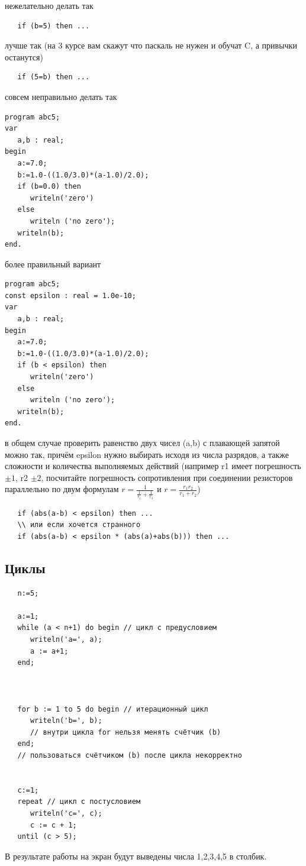 \documentclass[unicode, 12pt, a4paper,oneside,fleqn]{article}
\begin{document}
{\tiny
нежелательно делать так
\begin{verbatim}
   if (b=5) then ...
\end{verbatim}
лучше так (на 3 курсе вам скажут что паскаль
  не нужен и обучат C, а привычки останутся)
\begin{verbatim}
   if (5=b) then ...
\end{verbatim}


совсем неправильно делать так
\begin{verbatim}
program abc5;
var 
   a,b : real;
begin
   a:=7.0;
   b:=1.0-((1.0/3.0)*(a-1.0)/2.0); 
   if (b=0.0) then
      writeln('zero')
   else
      writeln ('no zero');
   writeln(b);
end.
\end{verbatim}

более правильный вариант
\begin{verbatim}
program abc5;
const epsilon : real = 1.0e-10;
var 
   a,b : real;
begin
   a:=7.0;
   b:=1.0-((1.0/3.0)*(a-1.0)/2.0); 
   if (b < epsilon) then
      writeln('zero')
   else
      writeln ('no zero');
   writeln(b);
end.
\end{verbatim}

в общем случае проверить равенство двух чисел (a,b) с плавающей
запятой можно так, причём epsilon нужно выбирать исходя из числа
разрядов, а также сложности и количества выполняемых действий
(например r1 имеет погрешность $\pm1$\textohm,  r2 $\pm2$\textohm, посчитайте
погрешность сопротивления при соединении резисторов параллельно по двум формулам
$r=\frac{1}{\frac{1}{r_1} + \frac{1}{r_2}}$ и $r=\frac{r_1r_2}{r_1 + r_2}$)

\begin{verbatim}
   if (abs(a-b) < epsilon) then ...
   \\ или если хочется странного
   if (abs(a-b) < epsilon * (abs(a)+abs(b))) then ...
\end{verbatim}
}

\subsection{Циклы}
\begin{verbatim}
   n:=5;
   
   a:=1;
   while (a < n+1) do begin // цикл с предусловием
      writeln('a=', a);
      a := a+1;
   end;
   
   
   
   for b := 1 to 5 do begin // итерационный цикл
      writeln('b=', b);
      // внутри цикла for нельзя менять счётчик (b)
   end;
   // пользоваться счётчиком (b) после цикла некорректно
   
   
   c:=1;
   repeat // цикл с постусловием
      writeln('c=', c);
      c := c + 1;
   until (c > 5);
\end{verbatim}
В результате работы на экран будут выведены числа 1,2,3,4,5 в столбик.
\end{document}
